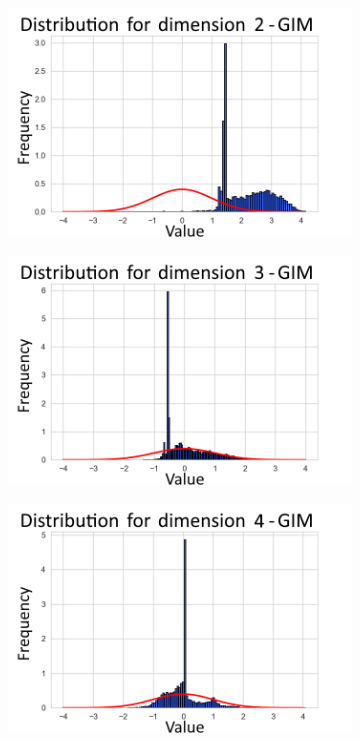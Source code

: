 \begin{figure}[h]
\begin{subfigure}[b]{0.25\textwidth}
	\end{subfigure}
	\hfill
	\begin{subfigure}[b]{0.25\textwidth}
		\centering
		\includegraphics[width=1\linewidth]{"graphs/distr/module1 kld0/_ distribution_latent_space_GIM_dim=1"}
	\end{subfigure}
	\hfill
	\begin{subfigure}[b]{0.25\textwidth}
		\centering
		\includegraphics[width=1\linewidth]{"graphs/distr/module1 kld0/_ distribution_latent_space_GIM_dim=2"}
	\end{subfigure}
	\hfill
	\begin{subfigure}[b]{0.25\textwidth}
		\centering
		\includegraphics[width=1\linewidth]{"graphs/distr/module1 kld0/_ distribution_latent_space_GIM_dim=3"}

\end{subfigure}
\end{figure}
